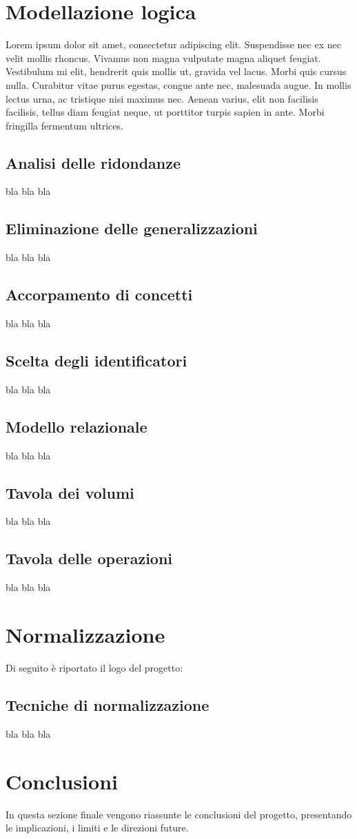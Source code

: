 \documentclass[12pt,a4paper]{article}
\begin{document}
    \section{Modellazione logica}
    Lorem ipsum dolor sit amet, consectetur adipiscing elit. Suspendisse nec ex nec velit mollis rhoncus. Vivamus non magna vulputate magna aliquet feugiat. Vestibulum mi elit, hendrerit quis mollis ut, gravida vel lacus. Morbi quis cursus nulla. Curabitur vitae purus egestas, congue ante nec, malesuada augue. In mollis lectus urna, ac tristique nisi maximus nec. Aenean varius, elit non facilisis facilisis, tellus diam feugiat neque, ut porttitor turpis sapien in ante. Morbi fringilla fermentum ultrices.
    \subsection{Analisi delle ridondanze}
    bla bla bla
    \subsection{Eliminazione delle generalizzazioni}
    bla bla bla
    \subsection{Accorpamento di concetti}
    bla bla bla
    \subsection{Scelta degli identificatori}
    bla bla bla
    \subsection{Modello relazionale}
    bla bla bla
    \subsection{Tavola dei volumi}
    bla bla bla
    \subsection{Tavola delle operazioni}
    bla bla bla

    \section{Normalizzazione}
    Di seguito è riportato il logo del progetto:
    \subsection{Tecniche di normalizzazione}
    bla bla bla

    \section{Conclusioni}
    In questa sezione finale vengono riassunte le conclusioni del progetto, presentando le implicazioni, i limiti e le direzioni future.
\end{document}
